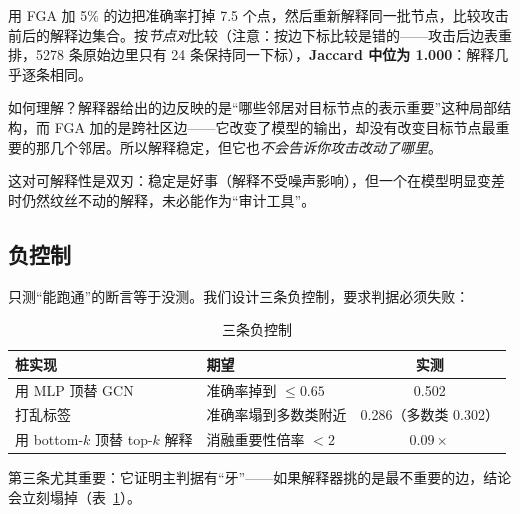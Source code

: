 用 FGA 加 5\% 的边把准确率打掉 7.5 个点，然后重新解释同一批节点，比较攻击前后的解释边集合。按\emph{节点对}比较（注意：按边下标比较是错的——攻击后边表重排，5278 条原始边里只有 24 条保持同一下标），\textbf{Jaccard 中位为 1.000}：解释几乎逐条相同。

如何理解？解释器给出的边反映的是“哪些邻居对目标节点的表示重要”这种局部结构，而 FGA 加的是跨社区边——它改变了模型的输出，却没有改变目标节点最重要的那几个邻居。所以解释稳定，但它也\emph{不会告诉你攻击改动了哪里}。

这对可解释性是双刃：稳定是好事（解释不受噪声影响），但一个在模型明显变差时仍然纹丝不动的解释，未必能作为“审计工具”。

\subsection{负控制}

只测“能跑通”的断言等于没测。我们设计三条负控制，要求判据必须失败：

\begin{table}[H]
\centering
\caption{三条负控制}
\label{tab:neg}
\small
\begin{tabular}{llc}
\toprule
桩实现 & 期望 & 实测 \\
\midrule
用 MLP 顶替 GCN & 准确率掉到 $\le0.65$ & 0.502 \\
打乱标签 & 准确率塌到多数类附近 & 0.286（多数类 0.302） \\
用 bottom-$k$ 顶替 top-$k$ 解释 & 消融重要性倍率 $<2$ & $0.09\times$ \\
\bottomrule
\end{tabular}
\end{table}

第三条尤其重要：它证明主判据有“牙”——如果解释器挑的是最不重要的边，结论会立刻塌掉（表~\ref{tab:neg}）。
